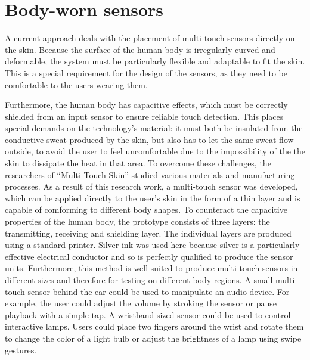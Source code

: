 \documentclass{sigchi}
\begin{document}
\section{Body-worn sensors}
A current approach deals with the placement of multi-touch sensors directly on the skin. Because the surface of the human body is irregularly curved and deformable, the system must be particularly flexible and adaptable to fit the skin. This is a special requirement for the design of the sensors, as they need to be comfortable to the users wearing them. \cite{ulbrich2,iSkin}%

Furthermore, the human body has capacitive effects, which must be correctly shielded from an input sensor to ensure reliable touch detection. This places special demands on the technology's material: it must both be insulated from the conductive sweat produced by the skin, but also has to let the same sweat flow outside, to avoid the user to feel uncomfortable due to the impossibility of the the skin to dissipate the heat in that area. \cite{ulbrich2} %
To overcome these challenges, the researchers of “Multi-Touch Skin” \cite{ulbrich2} studied various materials and manufacturing processes. As a result of this research work, a multi-touch sensor was developed, which can be applied directly to the user's skin in the form of a thin layer and is capable of comforming to different body shapes. To counteract the capacitive properties of the human body, the prototype consists of three layers: the transmitting, receiving and shielding layer. The individual layers are produced using a standard printer. Silver ink was used here because silver is a particularly effective electrical conductor and so is perfectly qualified to produce the sensor units. Furthermore, this method is well suited to produce multi-touch sensors in different sizes and therefore for testing on different body regions. \cite{ulbrich2}
A small multi-touch sensor behind the ear could be used to manipulate an audio device. For example, the user could adjust the volume by stroking the sensor or pause playback with a simple tap. A wristband sized sensor could be used to control interactive lamps. Users could place two fingers around the wrist and rotate them to change the color of a light bulb or adjust the brightness of a lamp using swipe gestures. \cite{ulbrich2}
\end{document}

